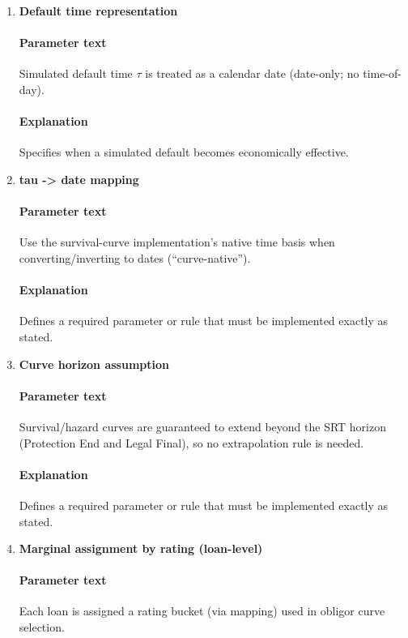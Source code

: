 \documentclass[11pt]{article}
\begin{document}
\begin{enumerate}[label=\arabic*),leftmargin=*,align=left]
\paragraph{Explanation} Defines a required parameter or rule that must be implemented exactly as stated.

\item \textbf{Default time representation}
\paragraph{Parameter text} Simulated default time $\tau$ is treated as a calendar date (date-only; no time-of-day).
\paragraph{Explanation} Specifies when a simulated default becomes economically effective.

\item \textbf{tau -> date mapping}
\paragraph{Parameter text} Use the survival-curve implementation’s native time basis when converting/inverting to dates (``curve-native'').
\paragraph{Explanation} Defines a required parameter or rule that must be implemented exactly as stated.

\item \textbf{Curve horizon assumption}
\paragraph{Parameter text} Survival/hazard curves are guaranteed to extend beyond the SRT horizon (Protection End and Legal Final), so no extrapolation rule is needed.
\paragraph{Explanation} Defines a required parameter or rule that must be implemented exactly as stated.

\item \textbf{Marginal assignment by rating (loan-level)}
\paragraph{Parameter text} Each loan is assigned a rating bucket (via mapping) used in obligor curve selection.

\end{enumerate}
\end{document}

